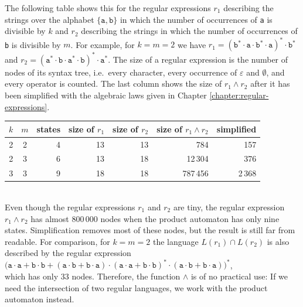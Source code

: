 The following table shows this for the regular expressions $r_1$ describing the strings over the alphabet
$\{\texttt{a}, \texttt{b}\}$ in which the number of occurrences of \texttt{a} is divisible by $k$ and $r_2$ describing the strings in
which the number of occurrences of \texttt{b} is divisible by $m$.  For example, for $k = m = 2$ we have
$r_1 = (\texttt{b}^* \cdot \texttt{a} \cdot \texttt{b}^* \cdot \texttt{a})^* \cdot \texttt{b}^*$ and
$r_2 = (\texttt{a}^* \cdot \texttt{b} \cdot \texttt{a}^* \cdot \texttt{b})^* \cdot \texttt{a}^*$.
The size of a regular expression is the number of nodes of its syntax tree, i.e.~every character, every
occurrence of $\varepsilon$ and $\emptyset$, and every operator is counted.  The last column shows the size of
$r_1 \wedge r_2$ after it has been simplified with the algebraic laws given in Chapter \ref{chapter:regular-expressions}.
\\[0.2cm]
\hspace*{1.3cm}
\begin{tabular}{|c|c|r|r|r|r|r|}
\hline
$k$ & $m$ & \textbf{states} & \textbf{size of $r_1$} & \textbf{size of $r_2$} & \textbf{size of $r_1 \wedge r_2$}
    & \textbf{simplified} \\
\hline
\hline
2 & 2 & 4 & 13 & 13 &     784 &  157 \\
\hline
2 & 3 & 6 & 13 & 18 &  12\,304 &  376 \\
\hline
3 & 3 & 9 & 18 & 18 & 787\,456 & 2\,368 \\
\hline
\end{tabular}
\\[0.2cm]
Even though the regular expressions $r_1$ and $r_2$ are tiny, the regular expression $r_1 \wedge r_2$ has
almost 800\,000 nodes when the product automaton has only nine states.  Simplification removes most of these
nodes, but the result is still far from readable.  For comparison, for $k = m = 2$ the language $L(r_1) \cap L(r_2)$
is also described by the regular expression
\\[0.2cm]
\hspace*{1.3cm}
$\bigl(\texttt{a} \cdot \texttt{a} + \texttt{b} \cdot \texttt{b} + (\texttt{a} \cdot \texttt{b} + \texttt{b} \cdot \texttt{a}) \cdot (\texttt{a} \cdot \texttt{a} + \texttt{b} \cdot \texttt{b})^* \cdot (\texttt{a} \cdot \texttt{b} + \texttt{b} \cdot \texttt{a})\bigr)^*$,
\\[0.2cm]
which has only 33 nodes.  Therefore, the function $\wedge$ is of no practical use:  If we need the intersection of
two regular languages, we work with the product automaton instead.
\eox

